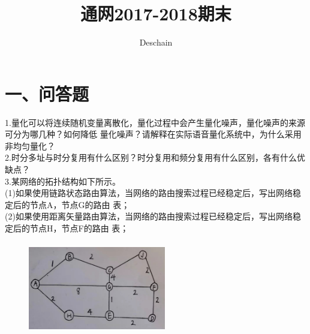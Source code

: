 \documentclass[UTF8]{ctexart}
\title{通网2017-2018期末}
\author{Deschain}
\begin{document}
\maketitle
\section*{一、问答题}
1.量化可以将连续随机变量离散化，量化过程中会产生量化噪声，量化噪声的来源可分为哪几种？如何降低
量化噪声？请解释在实际语音量化系统中，为什么采用非均匀量化？\\
2.时分多址与时分复用有什么区别？时分复用和频分复用有什么区别，各有什么优缺点？\\
3.某网络的拓扑结构如下所示。\\
(1)如果使用链路状态路由算法，当网络的路由搜索过程已经稳定后，写出网络稳定后的节点A，节点G的路由
表；\\
(2)如果使用距离矢量路由算法，当网络的路由搜索过程已经稳定后，写出网络稳定后的节点H，节点F的路由
表；\\
\begin{figure}[H]
  \centering
  \includegraphics[width=6cm,height=4cm]{1_3.jpg}
\end{figure}
\end{document}
